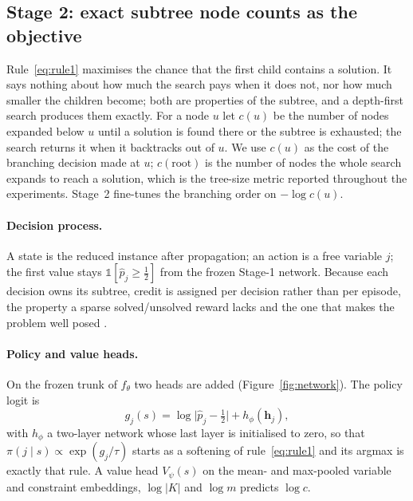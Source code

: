 \documentclass[final,5p,times,twocolumn,authoryear]{elsarticle}
\begin{document}
\subsection{Stage 2: exact subtree node counts as the objective}
\label{sec:method-stage2}

Rule~\eqref{eq:rule1} maximises the chance that the first child contains a solution. It says nothing about how much the search pays when it does not, nor how much smaller the children become; both are properties of the subtree, and a depth-first search produces them exactly. For a node $u$ let $c(u)$ be the number of nodes expanded below $u$ until a solution is found there or the subtree is exhausted; the search returns it when it backtracks out of $u$. We use $c(u)$ as the cost of the branching decision made at $u$; $c(\text{root})$ is the number of nodes the whole search expands to reach a solution, which is the tree-size metric reported throughout the experiments. Stage~2 fine-tunes the branching order on $-\log c(u)$.

\paragraph{Decision process.} A state is the reduced instance after propagation; an action is a free variable $j$; the first value stays $\mathbb{1}[\hat p_j\ge\frac12]$ from the frozen Stage-1 network. Because each decision owns its subtree, credit is assigned per decision rather than per episode, the property a sparse solved/unsolved reward lacks and the one that makes the problem well posed \citep{etheve2020reinforcement}.

\paragraph{Policy and value heads.} On the frozen trunk of $f_\theta$ two heads are added (Figure~\ref{fig:network}). The policy logit is
\begin{equation}
g_j(s)=\log\bigl|\hat p_j-\tfrac12\bigr|+h_\phi(\mathbf{h}_j),
\label{eq:policy}
\end{equation}
with $h_\phi$ a two-layer network whose last layer is initialised to zero, so that $\pi(j\mid s)\propto\exp(g_j/\tau)$ starts as a softening of rule~\eqref{eq:rule1} and its argmax is exactly that rule. A value head $V_\psi(s)$ on the mean- and max-pooled variable and constraint embeddings, $\log|K|$ and $\log m$ predicts $\log c$.
\end{document}
